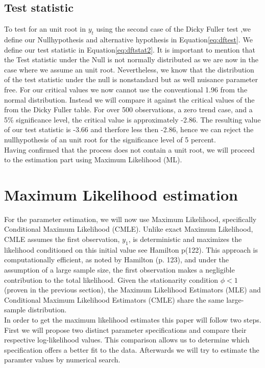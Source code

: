 \documentclass[11pt]{article}
\begin{document}
\subsection{Test statistic}
To test for an unit root in $y_t$ using the second case of the Dicky Fuller test ,we define our Nullhypothesis and alternative hypothesis in Equation\eqref{eq:dftest}.
We define our test statistic in Equation\eqref{eq:dftstat2}.
It is important to mention that the Test statistic under the Null is not normally distributed as we are now in the case where we assume an unit root. Nevertheless, we know that the distribution of the test statistic under the null is nonstandard but as well nuisance parameter free. For our critical values we now cannot use the conventional 1.96 from the normal distribution. Instead we will compare it  against the critical values of the from the Dicky Fuller table.
For over 500 observations, a zero trend case, and a 5\% significance level, the critical value is approximately -2.86.
The resulting value of our test statistic is -3.66 and therfore less then -2.86, hence we can reject the nullhypothesis of an unit root for the significance level of 5 percent.\\
Having confirmed that the process does not contain a unit root, we will proceed to the estimation part using Maximum Likelihood (ML). 

\section{Maximum Likelihood estimation}
For the parameter estimation, we will now use Maximum Likelihood, specifically Conditional Maximum Likelihood (CMLE). 
Unlike exact Maximum Likelihood, CMLE assumes the first observation, $y_1$, is deterministic and maximizes the likelihood conditioned on this initial value see Hamilton p(122).
This approach is computationally efficient, as noted by Hamilton (p. 123), and under the assumption of a large sample size, the first observation makes a negligible contribution to the total likelihood. 
Given the stationarity condition $\phi < 1$ (proven in the previous section), the Maximum Likelihood Estimators (MLE) and Conditional Maximum Likelihood Estimators (CMLE) share the same large-sample distribution.\\
In order to get the maximum likelihood estimates this paper will follow two steps. First we will propose two distinct parameter specifications and compare their respective log-likelihood values. This comparison allows us to determine which specification offers a better fit to the data.
Afterwards we will try to estimate the paramter values by numerical search.
\end{document}
